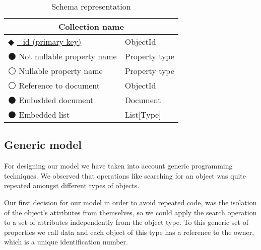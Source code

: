 \begin{table}[!htb]
\centering
\caption{Schema representation}
\label{table:schema}
    \begin{tabular}{|ll|}
        \hline
        \multicolumn{2}{|c|}{\textbf{Collection name}}       \\ \hline
        $\Diamondblack$ \underline{\_id (primary key)}  & ObjectId   \\ 
        $\medbullet$ Not nullable property name           & Property type                    \\ 
        $\medcirc$ Nullable property name      & Property type                         \\
        $\medcirc$ Reference to document     & ObjectId                         \\
        $\medbullet$ Embedded document      & Document                         \\ 
        $\medbullet$ Embedded list      & List[Type]                         \\ \hline
        
        
    \end{tabular}
\end{table}

\subsection {Generic model}

For designing our model we have taken into account generic programming techniques. We observed that operations like searching for an object was quite repeated amongst different types of objects. 

Our first decision for our model in order to avoid repeated code, was the isolation of the object's attributes from themselves, so we could apply the search operation to a set of attributes independently from the object type. To this generic set of properties we call data and each object of this type has a reference to the owner, which is a unique identification number.

